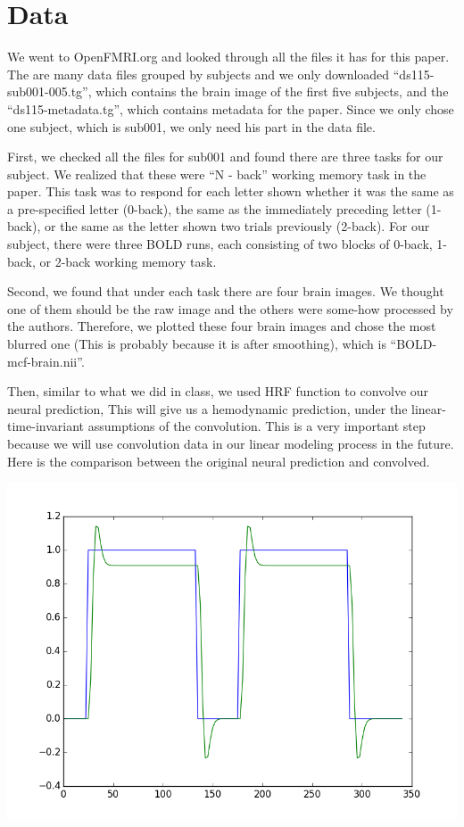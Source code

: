\documentclass[11pt]{article}
\begin{document}
\section{Data}

We went to OpenFMRI.org and looked through all the files it has for this paper. The are many data files grouped by subjects and we only downloaded ``ds115-sub001-005.tg'', which contains the brain image of the first five subjects, and the ``ds115-metadata.tg'', which contains metadata for the paper. Since we only chose one subject, which is sub001, we only need his part in the data file. 

First, we checked all the files for sub001 and found there are three tasks for our subject. We realized that these were ``N - back'' working memory task in the paper. This task was to respond for each letter shown whether it was the same as a pre-specified letter (0-back), the same as the immediately preceding letter (1-back), or the same as the letter shown two trials previously (2-back). For our subject, there were three BOLD runs, each consisting of two blocks of 0-back, 1-back, or 2-back working memory task. 

Second, we found that under each task there are four brain images. We thought one of them should be the raw image and the others were some-how processed by the authors. Therefore, we plotted these four brain images and chose the most blurred one (This is probably because it is after smoothing), which is ``BOLD-mcf-brain.nii''. 

Then, similar to what we did in class, we used HRF function to convolve our neural prediction, This will give us a hemodynamic prediction, under the linear-time-invariant assumptions of the convolution. This is a very important step because we will use convolution data in our linear modeling process in the future. Here is the comparison between the original neural prediction and convolved.

\includegraphics{task001_run001_conv005}
\end{document}
